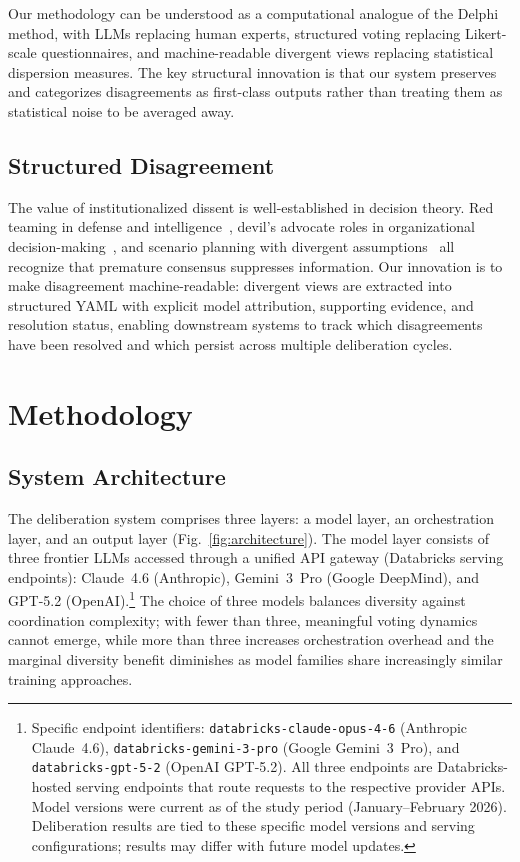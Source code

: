 \documentclass[11pt,a4paper]{article}
\begin{document}
Our methodology can be understood as a computational analogue of the Delphi method, with LLMs replacing human experts, structured voting replacing Likert-scale questionnaires, and machine-readable divergent views replacing statistical dispersion measures. The key structural innovation is that our system preserves and categorizes disagreements as first-class outputs rather than treating them as statistical noise to be averaged away.

\subsection{Structured Disagreement}

The value of institutionalized dissent is well-established in decision theory. Red teaming in defense and intelligence~\cite{zenko2015red}, devil's advocate roles in organizational decision-making~\cite{schwenk1990effects}, and scenario planning with divergent assumptions~\cite{schwartz1996art} all recognize that premature consensus suppresses information. Our innovation is to make disagreement machine-readable: divergent views are extracted into structured YAML with explicit model attribution, supporting evidence, and resolution status, enabling downstream systems to track which disagreements have been resolved and which persist across multiple deliberation cycles.

\section{Methodology}
\label{sec:methodology}

\subsection{System Architecture}
\label{sec:architecture}

The deliberation system comprises three layers: a model layer, an orchestration layer, and an output layer (Fig.~\ref{fig:architecture}). The model layer consists of three frontier LLMs accessed through a unified API gateway (Databricks serving endpoints): Claude~4.6 (Anthropic), Gemini~3~Pro (Google DeepMind), and GPT-5.2 (OpenAI).\footnote{Specific endpoint identifiers: \texttt{databricks-claude-opus-4-6} (Anthropic Claude~4.6), \texttt{databricks-gemini-3-pro} (Google Gemini~3~Pro), and \texttt{databricks-gpt-5-2} (OpenAI GPT-5.2). All three endpoints are Databricks-hosted serving endpoints that route requests to the respective provider APIs. Model versions were current as of the study period (January--February 2026). Deliberation results are tied to these specific model versions and serving configurations; results may differ with future model updates.} The choice of three models balances diversity against coordination complexity; with fewer than three, meaningful voting dynamics cannot emerge, while more than three increases orchestration overhead and the marginal diversity benefit diminishes as model families share increasingly similar training approaches.
\end{document}
